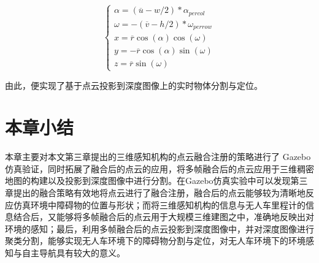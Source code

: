 \begin{equation}
    \begin{cases}
        \alpha = (\overline{u} - w / 2) * \alpha_{percol} \\
        \omega = -(\overline{v} - h / 2) * \omega_{perrow} \\
        x = \overline{r}\cos(\alpha)\cos(\omega) \\
        y = -\overline{r}\cos(\alpha)\sin(\omega) \\
        z = \overline{r}\sin(\omega)
    \end{cases}
\end{equation}


由此，便实现了基于点云投影到深度图像上的实时物体分割与定位。

\section{本章小结}

本章主要对本文第三章提出的三维感知机构的点云融合注册的策略进行了 Gazebo 仿真验证，同时拓展了融合后的点云的应用，将多帧融合后的点云应用于三维稠密地图的构建以及投影到深度图像中进行分割。在Gazebo仿真实验中可以发现第三章提出的融合策略有效地将点云进行了融合注册，融合后的点云能够较为清晰地反应仿真环境中障碍物的位置与形状；而将三维感知机构的信息与无人车里程计的信息结合后，又能够将多帧融合后的点云用于大规模三维建图之中，准确地反映出对环境的感知；最后，利用多帧融合后的点云投影到深度图像中，并对深度图像进行聚类分割，能够实现无人车环境下的障碍物分割与定位，对无人车环境下的环境感知与自主导航具有较大的意义。